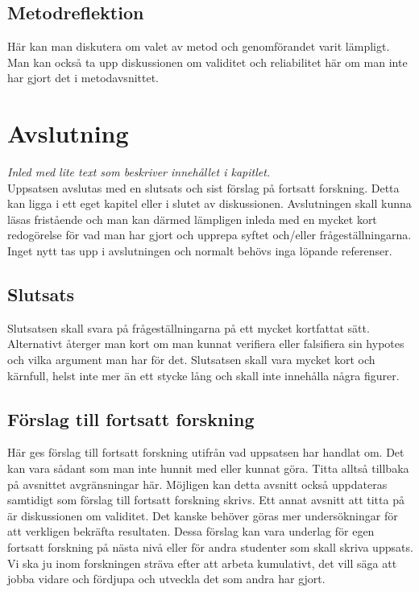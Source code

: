 \documentclass[a4paper,12pt]{article} %
\begin{document}
\subsection{Metodreflektion}
Här kan man diskutera om valet av metod och genomförandet varit lämpligt. Man kan också ta upp diskussionen om validitet och reliabilitet här om man inte har gjort det i metodavsnittet.

\newpage

\section{Avslutning}
\emph{Inled med lite text som beskriver innehållet i kapitlet.}\\
Uppsatsen avslutas med en slutsats och sist förslag på fortsatt forskning. Detta kan ligga i ett eget kapitel eller i slutet av diskussionen. Avslutningen skall kunna läsas fristående och man kan därmed lämpligen inleda med en mycket kort redogörelse för vad man har gjort och upprepa syftet och/eller frågeställningarna. Inget nytt tas upp i avslutningen och normalt behövs inga löpande referenser.

\subsection{Slutsats}
Slutsatsen skall svara på frågeställningarna på ett mycket kortfattat sätt. Alternativt återger man kort om man kunnat verifiera eller falsifiera sin hypotes och vilka argument man har för det. Slutsatsen skall vara mycket kort och kärnfull, helst inte mer än ett stycke lång och skall inte innehålla några figurer.

\subsection{Förslag till fortsatt forskning}
Här ges förslag till fortsatt forskning utifrån vad uppsatsen har handlat om. Det kan vara sådant som man inte hunnit med eller kunnat göra. Titta alltså tillbaka på avsnittet avgränsningar här. Möjligen kan detta avsnitt också uppdateras samtidigt som förslag till fortsatt forskning skrivs. Ett annat avsnitt att titta på är diskussionen om validitet. Det kanske behöver göras mer undersökningar för att verkligen bekräfta resultaten. Dessa förslag kan vara underlag för egen fortsatt forskning på nästa nivå eller för andra studenter som skall skriva uppsats. Vi ska ju inom forskningen sträva efter att arbeta kumulativt, det vill säga att jobba vidare och fördjupa och utveckla det som andra har gjort.
\end{document}
